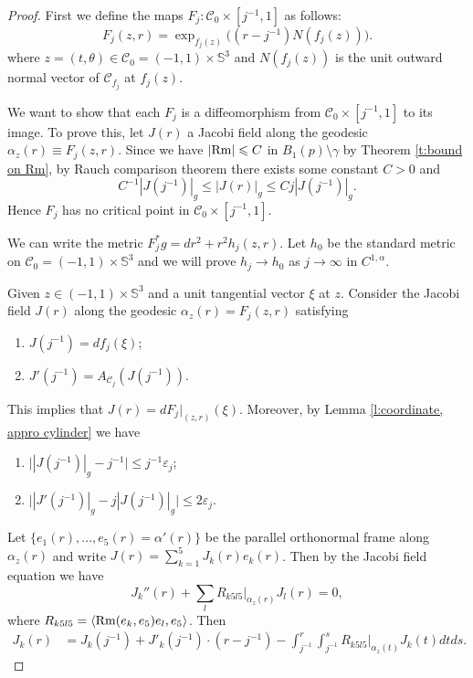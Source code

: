 \documentclass[11pt,reqno]{amsart}
\numberwithin{equation}{section}
\newcommand{\Rm}{{\rm Rm}}
\newcommand{\cC}{\mathcal{C}}
\theoremstyle{definition}
\theoremstyle{remark}
\begin{document}
\begin{proof}

First we define the maps $F_j : \cC_0 \times [j^{-1}, 1]$ as follows:
\begin{equation*}
    F_j(z,r) = \exp_{f_{j}(z)} \Big((r-j^{-1}) N(f_j(z)) \Big).
\end{equation*}
where $z=(t,\theta) \in \cC_0 = (-1,1) \times \mathbb{S}^3$ and $N(f_j(z))$ is the unit outward normal vector of $\cC_{f_j}$ at $f_j(z)$. 

We want to show that each $F_j$ is a diffeomorphism from $\cC_0 \times [j^{-1}, 1]$ to its image. To prove this, let $J(r)$ a Jacobi field along the geodesic $\alpha_z(r) \equiv F_j(z,r)$. Since we have $|\Rm| \leqslant C$ in $B_1(p) \setminus \gamma$ by Theorem \ref{t:bound on Rm}, by Rauch comparison theorem there exists some constant $C>0$ and 
\begin{equation*}
    C^{-1} |J(j^{-1})|_g \leqslant |J(r)|_g \leqslant C j |J(j^{-1})|_g.
\end{equation*}
Hence $F_j$ has no critical point in $\cC_0 \times [j^{-1}, 1]$. 


We can write the metric $F_j^*g =  dr^2 + r^2 h_j(z,r)$. Let $h_0$ be the standard metric on $ \cC_0 =  (-1,1) \times \mathbb{S}^3$ and we will prove $h_j \to h_0$ as $j \to \infty$ in $C^{1,\alpha}$. 

Given $z\in (-1,1)\times \mathbb{S}^3$ and a unit tangential vector $\xi$ at $z$. Consider the Jacobi field $J(r)$ along the geodesic $\alpha_z(r) = F_j(z,r)$ satisfying
\begin{enumerate}
    \item $J(j^{-1}) =  df_j(\xi)$;
    \item $J'(j^{-1}) = A_{\cC_j}(J(j^{-1}))$.
\end{enumerate}

This implies that $J(r) = dF_j|_{(z,r)}(\xi)$. Moreover, by Lemma \ref{l:coordinate, appro cylinder} we have
\begin{enumerate}
    \item $\big| |J(j^{-1})|_g - j^{-1}    \big| \leqslant j^{-1} \varepsilon_j$;
    \item $\big| |J'(j^{-1})|_{g} - j |J(j^{-1})|_g  \big| \leqslant 2\varepsilon_j$.
\end{enumerate}

Let $\{e_1(r), ..., e_5(r) = \alpha'(r)\}$ be the parallel orthonormal frame along $\alpha_z(r)$ and write $J(r) = \sum_{k=1}^5 J_k(r) e_k(r)$. Then by the Jacobi field equation we have
\begin{equation*}
    J_k''(r) + \sum_{l} R_{k5l5}|_{\alpha_z(r)}J_l(r) = 0,
\end{equation*}
where $R_{k5l5} = \langle \Rm(e_k,e_5)e_l , e_5 \rangle$. Then
\begin{equation*}
\begin{split}
        J_k(r) &= J_k(j^{-1}) + J'_k(j^{-1}) \cdot (r- j^{-1}) - \int_{j^{-1}}^r \int_{j^{-1}}^s R_{k5l5}|_{\alpha_z(t)}J_k(t) dt ds.
\end{split}
\end{equation*}


\end{proof}
\end{document}
